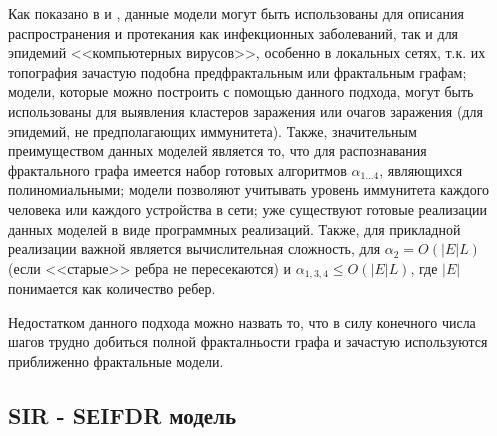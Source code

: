 Как показано в %
\cite{Bajaramukova:2014} и 
\cite{Utakaeva_disser:2011}, данные модели могут быть использованы для  описания распространения  и протекания как  инфекционных заболеваний, так и для эпидемий <<компьютерных вирусов>>, особенно в локальных сетях, т.к. их топография зачастую подобна предфрактальным или фрактальным графам; модели, которые можно построить с помощью данного подхода, могут быть использованы для выявления кластеров заражения или очагов заражения (для эпидемий, не предполагающих иммунитета). Также, значительным преимуществом данных моделей является то, что для распознавания фрактального графа  имеется набор готовых алгоритмов $\alpha_{1...4}$, являющихся полиномиальными; модели позволяют учитывать уровень иммунитета каждого человека или каждого устройства в сети; уже существуют готовые реализации данных моделей в виде программных реализаций. Также, для прикладной реализации важной является   вычислительная сложность, для $\alpha_2 = O(|E|L)$ (если <<старые>> ребра не пересекаются) и  $\alpha_{1,3,4} \leqslant O(|E|L)$, где $|E|$ понимается как количество ребер. 

Недостатком данного подхода можно назвать то, что в силу конечного числа шагов трудно добиться полной фракталньости графа и зачастую используются приближенно фрактальные модели.


\subsection{SIR - SЕIFDR модель}

